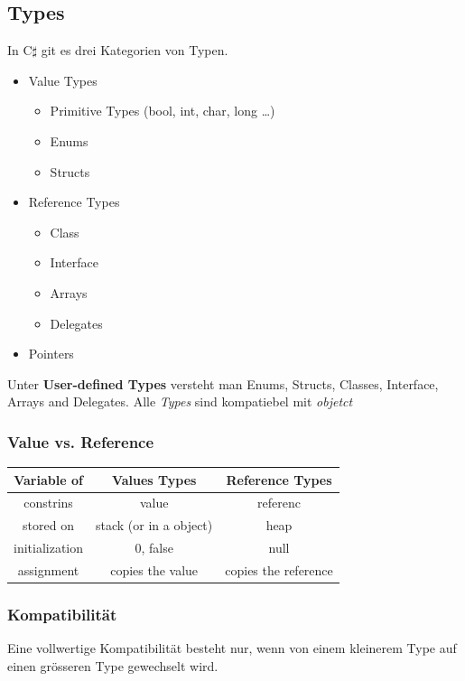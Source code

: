 \subsection{Types}

In C$\sharp$ git es drei Kategorien von Typen. 
\begin{itemize}
	\item Value Types
	\begin{itemize}
		\item Primitive Types (bool, int, char, long \ldots)
		\item Enums
		\item Structs
	\end{itemize}
	\item Reference Types
	\begin{itemize}
		\item Class
		\item Interface
		\item Arrays
		\item Delegates
	\end{itemize}
	\item Pointers
\end{itemize}

Unter \textbf{User-defined Types} versteht man Enums, Structs, Classes, Interface, Arrays and Delegates.
Alle \textsl{Types} sind kompatiebel mit \textsl{objetct}

\subsubsection{Value vs. Reference}
\begin{tabular}{|c|c|c|}
	\hline
	\textbf{Variable of} & \textbf{Values Types}  & \textbf{Reference Types} \\ \hline
	     constrins       &         value          &         referenc         \\ \hline
	     stored on       & stack (or in a object) &           heap           \\ \hline
	   initialization    &        0, false        &           null           \\ \hline
	     assignment      &    copies the value    &   copies the reference   \\ \hline
\end{tabular} 
\subsubsection{Kompatibilität}
Eine vollwertige Kompatibilität besteht nur, wenn von einem kleinerem Type auf einen grösseren Type gewechselt wird.

